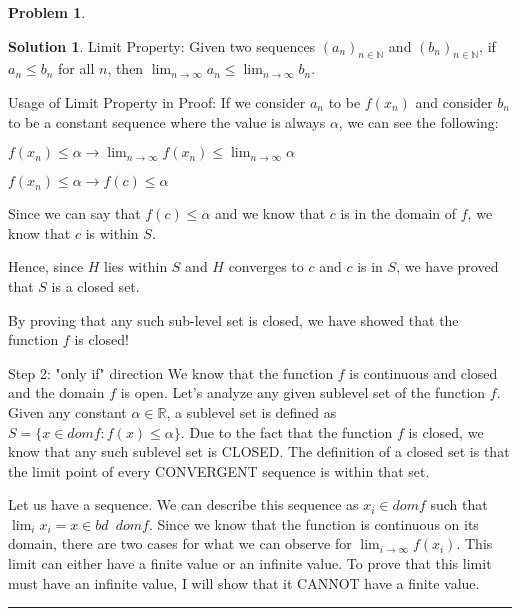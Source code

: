 \documentclass{article}
\theoremstyle{definition}
\newtheorem{problem}{Problem}
\def\fline{\rule{0.75\linewidth}{0.5pt}}
\newcommand{\finishline}{\begin{center}\fline\end{center}}
\newtheorem*{solution*}{Solution}
\newenvironment{solution}{\begin{solution*}}{{\finishline} \end{solution*}}
\begin{document}
\begin{problem}
\begin{solution}
Limit Property: \newline 
Given two sequences $(a_n)_{n \in \mathbb{N}}$ and $(b_n)_{n \in \mathbb{N}}$, if $a_n \leq b_n$ for all $n$, then  $\lim_{n\to\infty} a_n \leq \lim_{n\to\infty} b_n$. 

Usage of Limit Property in Proof: \newline 
If we consider $a_n$ to be $f(x_n)$ and consider $b_n$ to be a constant sequence where the value is always $\alpha$, we can see the following: \newline 

$f(x_n) \leq \alpha \rightarrow \lim_{n\to\infty} f(x_n) \leq \lim_{n\to\infty} \alpha$ \newline 

$f(x_n) \leq \alpha \rightarrow f(c) \leq \alpha$ \newline 

Since we can say that $f(c) \leq \alpha$ and we know that $c$ is in the domain of $f$, we know that $c$ is within $S$. \newline 


Hence, since $H$ lies within $S$ and $H$ converges to $c$ and $c$ is in $S$, we have proved that $S$ is a closed set. \newline 


By proving that any such sub-level set is closed, we have showed that the function $f$ is closed! \newline 




Step 2: "only if" direction \newline 
We know that the function $f$ is continuous and closed and the domain $f$ is open. Let's analyze any given sublevel set of the function $f$. Given any constant $\alpha \in \mathbb{R}$, a sublevel set is defined as $S = \{x \in dom f : f(x) \leq \alpha \}$. Due to the fact that the function $f$ is closed, we know that any such sublevel set is CLOSED. The definition of a closed set is that the limit point of every CONVERGENT sequence is within that set. 

Let us have a sequence. We can describe this sequence as $x_i \in dom f$ such that $\lim_{i} x_i = x \in bd \enspace dom f$. Since we know that the function is continuous on its domain, there are two cases for what we can observe for $\lim_{i\to\infty} f(x_i)$. This limit can either have a finite value or an infinite value. To prove that this limit must have an infinite value, I will show that it CANNOT have a finite value. \newline 


\end{solution}
\end{problem}
\end{document}
